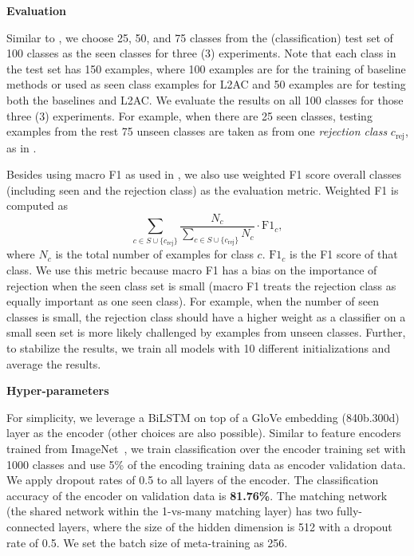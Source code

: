\textbf{Evaluation}

Similar to \cite{shu-xu-liu:2017:EMNLP2017}, we choose 25, 50, and 75 classes from the (classification) test set of 100 classes as the seen classes for three (3) experiments.
Note that each class in the test set has 150 examples, where 100 examples are for the training of baseline methods or used as seen class examples for L2AC and 50 examples are for testing both the baselines and L2AC.
We evaluate the results on all 100 classes for those three (3) experiments.
For example, when there are 25 seen classes, testing examples from the rest 75 unseen classes are taken as from one \textit{rejection class} $c_\text{rej}$, as in \cite{shu-xu-liu:2017:EMNLP2017}.

Besides using macro F1 as used in \cite{shu-xu-liu:2017:EMNLP2017}, we also use weighted F1 score overall classes (including seen and the rejection class) as the evaluation metric.
Weighted F1 is computed as 
\begin{equation}
\sum_{c\in S\cup\{c_\text{rej}\} } \frac{N_c}{\sum_{c\in S\cup\{c_\text{rej}\}}N_c  }\cdot \text{F1}_c,
\end{equation}
where $N_c$ is the total number of examples for class $c$. $\text{F1}_c$ is the F1 score of that class.
We use this metric because macro F1 has a bias on the importance of rejection when the seen class set is small (macro F1 treats the rejection class as equally important as one seen class).
For example, when the number of seen classes is small, the rejection class should have a higher weight as a classifier on a small seen set is more likely challenged by examples from unseen classes.
Further, to stabilize the results, we train all models with 10 different initializations and average the results.

\textbf{Hyper-parameters}

For simplicity, we leverage a BiLSTM \cite{hochreiter1997long,schuster1997bidirectional} on top of a GloVe \cite{pennington2014glove} embedding (840b.300d) layer as the encoder (other choices are also possible).
Similar to feature encoders trained from ImageNet~\cite{russakovsky2015imagenet}, we train classification over the encoder training set with 1000 classes and use 5\% of the encoding training data as encoder validation data.
We apply dropout rates of 0.5 to all layers of the encoder. 
The classification accuracy of the encoder on validation data is \textbf{81.76\%}.
The matching network (the shared network within the 1-vs-many matching layer) has two fully-connected layers, where the size of the hidden dimension is 512 with a dropout rate of 0.5.
We set the batch size of meta-training as 256.


